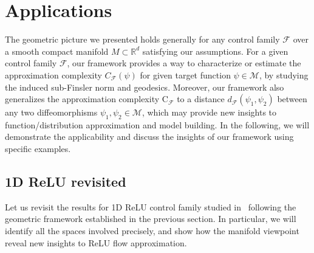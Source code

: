 \documentclass[12pt]{amsart}
\numberwithin{equation}{section}
\theoremstyle{remark}
\begin{document}
\section{Applications}
\label{sec:applications}

The geometric picture we presented holds generally for any control family $\mathcal F$ over a smooth compact manifold $M \subset \mathbb R^d$  satisfying our assumptions. For a given control family $\mathcal F$, our framework provides a way to characterize or estimate the approximation complexity $C_{\mathcal F}(\psi)$ for given target function $\psi
\in \mathcal M$, by studying the induced sub-Finsler norm and geodesics. Moreover, our framework also generalizes the approximation complexity $\mathrm C_{\mathcal F}$ to a distance $d_{\mathcal F}(\psi_1, \psi_2)$ between any two diffeomorphisms $\psi_1, \psi_2\in \mathcal M$, which may provide new insights to function/distribution approximation and model building.
In the following, we will demonstrate the applicability and discuss the insights of our framework using specific examples.

\subsection{1D ReLU revisited}
Let us revisit the results for 1D ReLU control family
studied in~ following the geometric framework established in the previous section.
In particular, we will identify all the spaces involved precisely,
and show how the manifold viewpoint reveal new insights to ReLU flow approximation.
\end{document}
